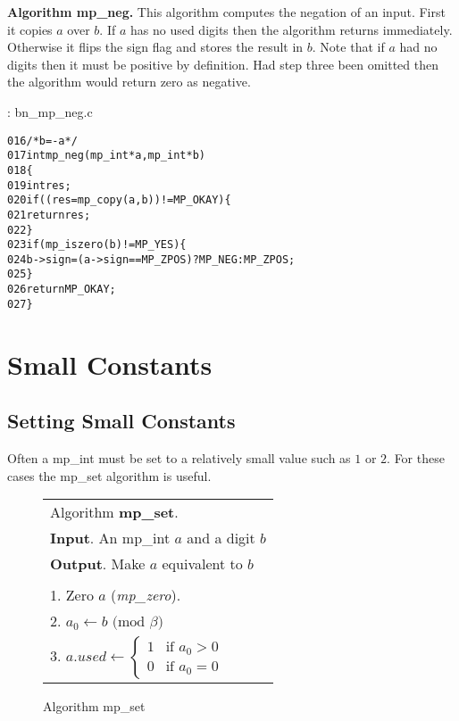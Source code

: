 \documentclass[b5paper]{book}
\begin{document}
\textbf{Algorithm mp\_neg.}
This algorithm computes the negation of an input.  First it copies $a$ over $b$.  If $a$ has no used digits then
the algorithm returns immediately.  Otherwise it flips the sign flag and stores the result in $b$.  Note that if 
$a$ had no digits then it must be positive by definition.  Had step three been omitted then the algorithm would return
zero as negative.

\vspace{+3mm}\begin{small}
\hspace{-5.1mm}{\bf File}: bn\_mp\_neg.c
\vspace{-3mm}
\begin{alltt}
016   /* b = -a */
017   int mp_neg (mp_int * a, mp_int * b)
018   \{
019     int     res;
020     if ((res = mp_copy (a, b)) != MP_OKAY) \{
021       return res;
022     \}
023     if (mp_iszero(b) != MP_YES) \{
024        b->sign = (a->sign == MP_ZPOS) ? MP_NEG : MP_ZPOS;
025     \}
026     return MP_OKAY;
027   \}
\end{alltt}
\end{small}

\section{Small Constants}
\subsection{Setting Small Constants}
Often a mp\_int must be set to a relatively small value such as $1$ or $2$.  For these cases the mp\_set algorithm is useful.

\begin{figure}[here]
\begin{center}
\begin{tabular}{l}
\hline Algorithm \textbf{mp\_set}. \\
\textbf{Input}.   An mp\_int $a$ and a digit $b$ \\
\textbf{Output}.  Make $a$ equivalent to $b$ \\
\hline \\
1.  Zero $a$ (\textit{mp\_zero}). \\
2.  $a_0 \leftarrow b \mbox{ (mod }\beta\mbox{)}$ \\
3.  $a.used \leftarrow  \left \lbrace \begin{array}{ll}
                              1 &  \mbox{if }a_0 > 0 \\
                              0 &  \mbox{if }a_0 = 0 
                              \end{array} \right .$ \\
\hline                              
\end{tabular}
\end{center}
\caption{Algorithm mp\_set}
\end{figure}
\end{document}
